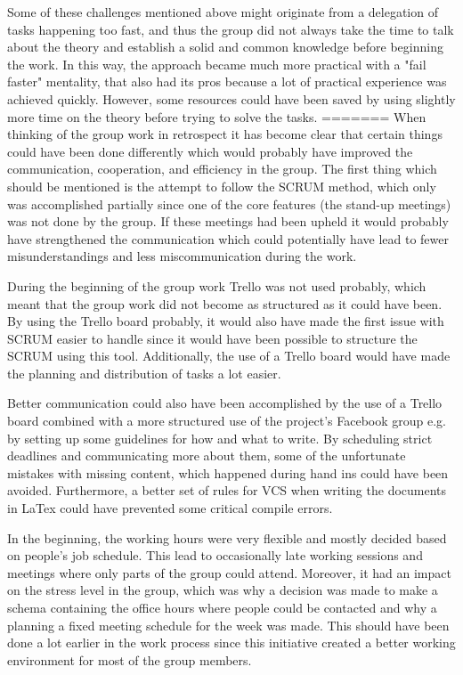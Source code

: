 Some of these challenges mentioned above might originate from a delegation of tasks happening too fast, and thus the group did not always take the time to talk about the theory and establish a solid and common knowledge before beginning the work. In this way, the approach became much more practical with a "fail faster" mentality, that also had its pros because a lot of practical experience was achieved quickly. However, some resources could have been saved by using slightly more time on the theory before trying to solve the tasks.
=======
When thinking of the group work in retrospect it has become clear that certain things could have been done differently which would probably have improved the communication, cooperation, and efficiency in the group.
The first thing which should be mentioned is the attempt to follow the SCRUM method, which only was accomplished partially since one of the core features (the stand-up meetings) was not done by the group. If these meetings had been upheld it would probably have strengthened the communication which could potentially have lead to fewer misunderstandings and less miscommunication during the work.

During the beginning of the group work Trello was not used probably, which meant that the group work did not become as structured as it could have been. By using the Trello board probably, it would also have made the first issue with SCRUM easier to handle since it would have been possible to structure the SCRUM using this tool. Additionally, the use of a Trello board would have made the planning and distribution of tasks a lot easier.

Better communication could also have been accomplished by the use of a Trello board combined with a more structured use of the project's  Facebook group e.g. by setting up some guidelines for how and what to write. By scheduling strict deadlines and communicating more about them, some of the unfortunate mistakes with missing content, which happened during hand ins could have been avoided. Furthermore, a better set of rules for VCS when writing the documents in LaTex could have prevented some critical compile errors.

In the beginning, the working hours were very flexible and mostly decided based on people's job schedule. This lead to occasionally  late working sessions and meetings where only parts of the group could attend. Moreover, it had an impact on the stress level in the group, which was why a decision was made to make a schema containing the office hours where people could be contacted and why a planning a fixed meeting schedule for the week was made. This should have been done a lot earlier in the work process since this initiative created a better working environment for most of the group members.

